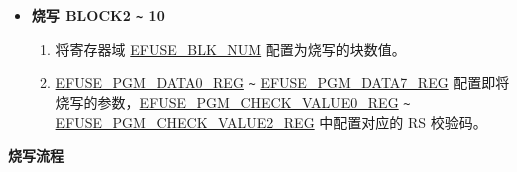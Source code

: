 \documentclass[main\_\_CN.tex]{subfiles}
\begin{document}
\begin{itemize}
\begin{enumerate}
    \end{enumerate}
    \item {\bfseries 烧写 BLOCK2 \verb+~+ 10}
    \begin{enumerate}
        \item 将寄存器域 \hyperref[fielddesc:EFUSEBLKNUM]{EFUSE\_BLK\_NUM} 配置为烧写的块数值。
        \item \hyperref[regdesc:EFUSEPGMDATA0REG]{EFUSE\_PGM\_DATA0\_REG} \verb+~+ \hyperref[regdesc:EFUSEPGMDATA7REG]{EFUSE\_PGM\_DATA7\_REG} 配置即将烧写的参数，\hyperref[regdesc:EFUSEPGMCHECKVALUE0REG]{EFUSE\_PGM\_CHECK\_VALUE0\_REG}  \verb+~+ \hyperref[regdesc:EFUSEPGMCHECKVALUE2REG]{EFUSE\_PGM\_CHECK\_VALUE2\_REG} 中配置对应的 RS 校验码。
    \end{enumerate}
\end{itemize}

{\bfseries 烧写流程}
\end{document}
